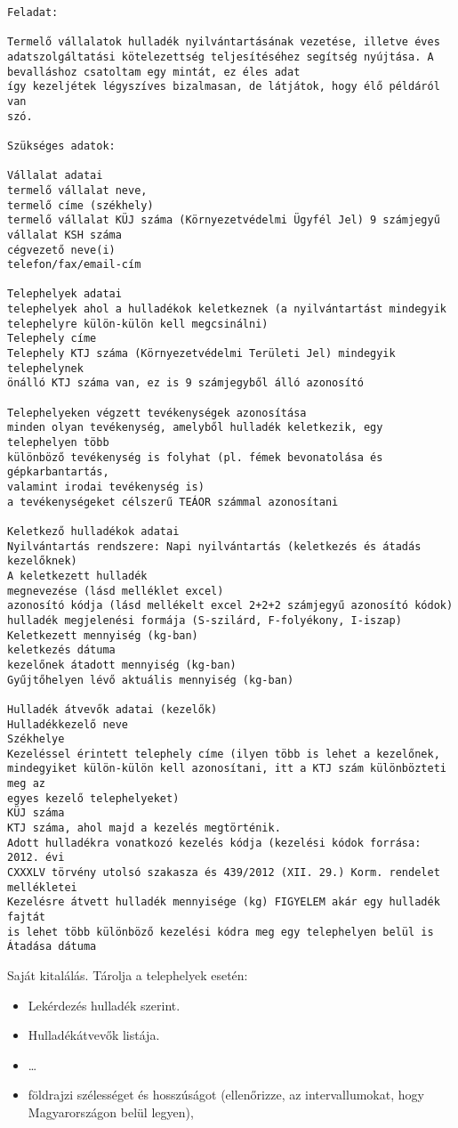 \documentclass[a4paper]{article}
\begin{document}
\begin{verbatim}
Feladat: 

Termelő vállalatok hulladék nyilvántartásának vezetése, illetve éves
adatszolgáltatási kötelezettség teljesítéséhez segítség nyújtása. A
bevalláshoz csatoltam egy mintát, ez éles adat
így kezeljétek légyszíves bizalmasan, de látjátok, hogy élő példáról van
szó.

Szükséges adatok:

Vállalat adatai
termelő vállalat neve,
termelő címe (székhely)
termelő vállalat KÜJ száma (Környezetvédelmi Ügyfél Jel) 9 számjegyű
vállalat KSH száma
cégvezető neve(i)
telefon/fax/email-cím

Telephelyek adatai
telephelyek ahol a hulladékok keletkeznek (a nyilvántartást mindegyik
telephelyre külön-külön kell megcsinálni)
Telephely címe
Telephely KTJ száma (Környezetvédelmi Területi Jel) mindegyik telephelynek
önálló KTJ száma van, ez is 9 számjegyből álló azonosító

Telephelyeken végzett tevékenységek azonosítása
minden olyan tevékenység, amelyből hulladék keletkezik, egy telephelyen több
különböző tevékenység is folyhat (pl. fémek bevonatolása és gépkarbantartás,
valamint irodai tevékenység is)
a tevékenységeket célszerű TEÁOR számmal azonosítani

Keletkező hulladékok adatai
Nyilvántartás rendszere: Napi nyilvántartás (keletkezés és átadás
kezelőknek)
A keletkezett hulladék
megnevezése (lásd melléklet excel)
azonosító kódja (lásd mellékelt excel 2+2+2 számjegyű azonosító kódok)
hulladék megjelenési formája (S-szilárd, F-folyékony, I-iszap)
Keletkezett mennyiség (kg-ban)
keletkezés dátuma
kezelőnek átadott mennyiség (kg-ban)
Gyűjtőhelyen lévő aktuális mennyiség (kg-ban)

Hulladék átvevők adatai (kezelők)
Hulladékkezelő neve
Székhelye
Kezeléssel érintett telephely címe (ilyen több is lehet a kezelőnek,
mindegyiket külön-külön kell azonosítani, itt a KTJ szám különbözteti meg az
egyes kezelő telephelyeket)
KÜJ száma
KTJ száma, ahol majd a kezelés megtörténik.
Adott hulladékra vonatkozó kezelés kódja (kezelési kódok forrása: 2012. évi
CXXXLV törvény utolsó szakasza és 439/2012 (XII. 29.) Korm. rendelet
mellékletei
Kezelésre átvett hulladék mennyisége (kg) FIGYELEM akár egy hulladék fajtát
is lehet több különböző kezelési kódra meg egy telephelyen belül is
Átadása dátuma
\end{verbatim}

Saját kitalálás. Tárolja a telephelyek esetén:
\begin{itemize}
    \item Lekérdezés hulladék szerint.
    \item Hulladékátvevők listája.
    \item \ldots
    \item földrajzi szélességet és hosszúságot (ellenőrizze, az intervallumokat,
	hogy Magyarországon belül legyen),
\end{itemize}
\end{document}
